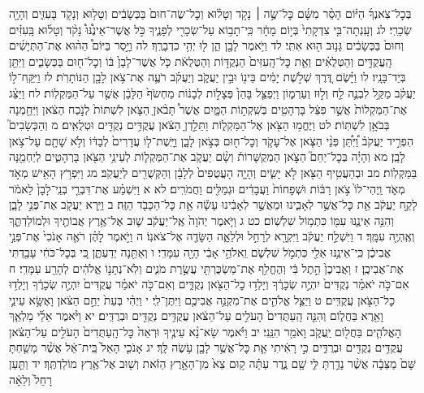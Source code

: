 \documentclass[twoside, openany, parskip=half, 11pt]{book}
\begin{document}
בְּכׇל־צֹֽאנְךָ֜ הַיּ֗וֹם הָסֵ֨ר מִשָּׁ֜ם כׇּל־שֶׂ֣ה ׀ נָקֹ֣ד וְטָל֗וּא וְכׇל־שֶׂה־חוּם֙ בַּכְּשָׂבִ֔ים וְטָל֥וּא וְנָקֹ֖ד בָּעִזִּ֑ים וְהָיָ֖ה שְׂכָרִֽי׃ לג וְעָֽנְתָה־בִּ֤י צִדְקָתִי֙ בְּי֣וֹם מָחָ֔ר כִּֽי־תָב֥וֹא עַל־שְׂכָרִ֖י לְפָנֶ֑יךָ כֹּ֣ל אֲשֶׁר־אֵינֶ֩נּוּ֩ נָקֹ֨ד וְטָל֜וּא בָּֽעִזִּ֗ים וְחוּם֙ בַּכְּשָׂבִ֔ים גָּנ֥וּב ה֖וּא אִתִּֽי׃ לד וַיֹּ֥אמֶר לָבָ֖ן הֵ֑ן ל֖וּ יְהִ֥י כִדְבָרֶֽךָ׃ לה וַיָּ֣סַר בַּיּוֹם֩ הַה֨וּא אֶת־הַתְּיָשִׁ֜ים הָֽעֲקֻדִּ֣ים וְהַטְּלֻאִ֗ים וְאֵ֤ת כׇּל־הָֽעִזִּים֙ הַנְּקֻדּ֣וֹת וְהַטְּלֻאֹ֔ת כֹּ֤ל אֲשֶׁר־לָבָן֙ בּ֔וֹ וְכׇל־ח֖וּם בַּכְּשָׂבִ֑ים וַיִּתֵּ֖ן בְּיַד־בָּנָֽיו׃ לו וַיָּ֗שֶׂם דֶּ֚רֶךְ שְׁלֹ֣שֶׁת יָמִ֔ים בֵּינ֖וֹ וּבֵ֣ין יַעֲקֹ֑ב וְיַעֲקֹ֗ב רֹעֶ֛ה אֶת־צֹ֥אן לָבָ֖ן הַנּוֹתָרֹֽת׃ לז וַיִּֽקַּֽח־ל֣וֹ יַעֲקֹ֗ב מַקַּ֥ל לִבְנֶ֛ה לַ֖ח וְל֣וּז וְעַרְמ֑וֹן וַיְפַצֵּ֤ל בָּהֵן֙ פְּצָל֣וֹת לְבָנ֔וֹת מַחְשֹׂף֙ הַלָּבָ֔ן אֲשֶׁ֖ר עַל־הַמַּקְלֽוֹת׃ לח וַיַּצֵּ֗ג אֶת־הַמַּקְלוֹת֙ אֲשֶׁ֣ר פִּצֵּ֔ל בָּרְהָטִ֖ים בְּשִֽׁקְת֣וֹת הַמָּ֑יִם אֲשֶׁר֩ תָּבֹ֨אןָ הַצֹּ֤אן לִשְׁתּוֹת֙ לְנֹ֣כַח הַצֹּ֔אן וַיֵּחַ֖מְנָה בְּבֹאָ֥ן לִשְׁתּֽוֹת׃ לט וַיֶּחֱמ֥וּ הַצֹּ֖אן אֶל־הַמַּקְל֑וֹת וַתֵּלַ֣דְןָ הַצֹּ֔אן עֲקֻדִּ֥ים נְקֻדִּ֖ים וּטְלֻאִֽים׃ מ וְהַכְּשָׂבִים֮ הִפְרִ֣יד יַעֲקֹב֒ וַ֠יִּתֵּ֠ן פְּנֵ֨י הַצֹּ֧אן אֶל־עָקֹ֛ד וְכׇל־ח֖וּם בְּצֹ֣אן לָבָ֑ן וַיָּֽשֶׁת־ל֤וֹ עֲדָרִים֙ לְבַדּ֔וֹ וְלֹ֥א שָׁתָ֖ם עַל־צֹ֥אן לָבָֽן׃ מא וְהָיָ֗ה בְּכׇל־יַחֵם֮ הַצֹּ֣אן הַמְקֻשָּׁרוֹת֒ וְשָׂ֨ם יַעֲקֹ֧ב אֶת־הַמַּקְל֛וֹת לְעֵינֵ֥י הַצֹּ֖אן בָּרְהָטִ֑ים לְיַחְמֵ֖נָּה בַּמַּקְלֽוֹת׃ מב וּבְהַעֲטִ֥יף הַצֹּ֖אן לֹ֣א יָשִׂ֑ים וְהָיָ֤ה הָעֲטֻפִים֙ לְלָבָ֔ן וְהַקְּשֻׁרִ֖ים לְיַעֲקֹֽב׃ מג וַיִּפְרֹ֥ץ הָאִ֖ישׁ מְאֹ֣ד מְאֹ֑ד וַֽיְהִי־לוֹ֙ צֹ֣אן רַבּ֔וֹת וּשְׁפָחוֹת֙ וַעֲבָדִ֔ים וּגְמַלִּ֖ים וַחֲמֹרִֽים׃ לא א וַיִּשְׁמַ֗ע אֶת־דִּבְרֵ֤י בְנֵֽי־לָבָן֙ לֵאמֹ֔ר לָקַ֣ח יַעֲקֹ֔ב אֵ֖ת כׇּל־אֲשֶׁ֣ר לְאָבִ֑ינוּ וּמֵאֲשֶׁ֣ר לְאָבִ֔ינוּ עָשָׂ֕ה אֵ֥ת כׇּל־הַכָּבֹ֖ד הַזֶּֽה׃ ב וַיַּ֥רְא יַעֲקֹ֖ב אֶת־פְּנֵ֣י לָבָ֑ן וְהִנֵּ֥ה אֵינֶ֛נּוּ עִמּ֖וֹ כִּתְמ֥וֹל שִׁלְשֽׁוֹם׃ כט ג וַיֹּ֤אמֶר יְהֹוָה֙ אֶֽל־יַעֲקֹ֔ב שׁ֛וּב אֶל־אֶ֥רֶץ אֲבוֹתֶ֖יךָ וּלְמוֹלַדְתֶּ֑ךָ וְאֶֽהְיֶ֖ה עִמָּֽךְ׃ ד וַיִּשְׁלַ֣ח יַעֲקֹ֔ב וַיִּקְרָ֖א לְרָחֵ֣ל וּלְלֵאָ֑ה הַשָּׂדֶ֖ה אֶל־צֹאנֽוֹ׃ ה וַיֹּ֣אמֶר לָהֶ֗ן רֹאֶ֤ה אָנֹכִי֙ אֶת־פְּנֵ֣י אֲבִיכֶ֔ן כִּֽי־אֵינֶ֥נּוּ אֵלַ֖י כִּתְמֹ֣ל שִׁלְשֹׁ֑ם וֵֽאלֹהֵ֣י אָבִ֔י הָיָ֖ה עִמָּדִֽי׃ ו וְאַתֵּ֖נָה יְדַעְתֶּ֑ן כִּ֚י בְּכׇל־כֹּחִ֔י עָבַ֖דְתִּי אֶת־אֲבִיכֶֽן׃ ז וַאֲבִיכֶן֙ הֵ֣תֶל בִּ֔י וְהֶחֱלִ֥ף אֶת־מַשְׂכֻּרְתִּ֖י עֲשֶׂ֣רֶת מֹנִ֑ים וְלֹֽא־נְתָנ֣וֹ אֱלֹהִ֔ים לְהָרַ֖ע עִמָּדִֽי׃ ח אִם־כֹּ֣ה יֹאמַ֗ר נְקֻדִּים֙ יִהְיֶ֣ה שְׂכָרֶ֔ךָ וְיָלְד֥וּ כׇל־הַצֹּ֖אן נְקֻדִּ֑ים וְאִם־כֹּ֣ה יֹאמַ֗ר עֲקֻדִּים֙ יִהְיֶ֣ה שְׂכָרֶ֔ךָ וְיָלְד֥וּ כׇל־הַצֹּ֖אן עֲקֻדִּֽים׃ ט וַיַּצֵּ֧ל אֱלֹהִ֛ים אֶת־מִקְנֵ֥ה אֲבִיכֶ֖ם וַיִּתֶּן־לִֽי׃ י וַיְהִ֗י בְּעֵת֙ יַחֵ֣ם הַצֹּ֔אן וָאֶשָּׂ֥א עֵינַ֛י וָאֵ֖רֶא בַּחֲל֑וֹם וְהִנֵּ֤ה הָֽעַתֻּדִים֙ הָעֹלִ֣ים עַל־הַצֹּ֔אן עֲקֻדִּ֥ים נְקֻדִּ֖ים וּבְרֻדִּֽים׃ יא וַיֹּ֨אמֶר אֵלַ֜י מַלְאַ֧ךְ הָאֱלֹהִ֛ים בַּחֲל֖וֹם יַֽעֲקֹ֑ב וָאֹמַ֖ר הִנֵּֽנִי׃ יב וַיֹּ֗אמֶר שָׂא־נָ֨א עֵינֶ֤יךָ וּרְאֵה֙ כׇּל־הָֽעַתֻּדִים֙ הָעֹלִ֣ים עַל־הַצֹּ֔אן עֲקֻדִּ֥ים נְקֻדִּ֖ים וּבְרֻדִּ֑ים כִּ֣י רָאִ֔יתִי אֵ֛ת כׇּל־אֲשֶׁ֥ר לָבָ֖ן עֹ֥שֶׂה לָּֽךְ׃ יג אָנֹכִ֤י הָאֵל֙ בֵּֽית־אֵ֔ל אֲשֶׁ֨ר מָשַׁ֤חְתָּ שָּׁם֙ מַצֵּבָ֔ה אֲשֶׁ֨ר נָדַ֥רְתָּ לִּ֛י שָׁ֖ם נֶ֑דֶר עַתָּ֗ה ק֥וּם צֵא֙ מִן־הָאָ֣רֶץ הַזֹּ֔את וְשׁ֖וּב אֶל־אֶ֥רֶץ מוֹלַדְתֶּֽךָ׃ יד וַתַּ֤עַן רָחֵל֙ וְלֵאָ֔ה 
\end{document}
